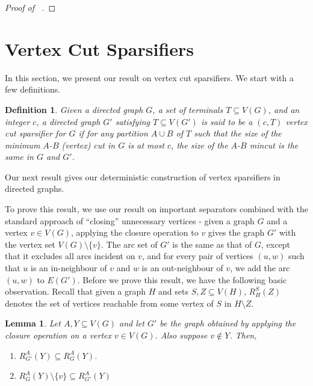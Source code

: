 \documentclass[11pt]{article}
\newtheorem{lemma}[theorem]{Lemma}
\newtheorem{definition}[theorem]{Definition}
\begin{document}
{\begin{proof}[Proof of ~]
\end{proof}


\section{Vertex Cut Sparsifiers}

In this section, we present our result on vertex cut sparsifiers. We start with a few definitions.


\begin{definition}
Given a directed graph $G$, a set of terminals $T \subseteq V(G)$, and an integer $c$, a directed graph $G'$ satisfying $T \subseteq V(G')$ is said to be a $(c,T)$ vertex cut sparsifier for $G$ if for any partition $A \cup B$ of $T$ such that the size of the minimum $A$-$B$ (vertex) cut in $G$ is at most $c$, the size of the $A$-$B$ mincut is the same in $G$ and $G'$.
\end{definition}


Our next result gives our deterministic construction of vertex sparsifiers in directed graphs.
\mimicking*


To prove this result, we use our result on important separators combined with the standard approach of ``closing'' unnecessary vertices - given a graph $G$ and a vertex $v \in V(G)$, applying the closure operation to $v$ gives the graph $G'$ with the vertex set $V(G) \setminus \{v\}$. The arc set of $G'$ is the same as that of $G$, except that it excludes all arcs incident on $v$, and for every pair of vertices $(u,w)$ such that $u$ is an in-neighbour of $v$ and $w$ is an out-neighbour of $v$,
we add the arc $(u,w)$ to $E(G')$. Before we prove this result, we have the following basic observation. Recall that given a graph $H$ and sets $S,Z \subseteq V(H)$, $R_H^S(Z)$ denotes the set of vertices reachable from some vertex of $S$ in $H \setminus Z$.

\begin{lemma}\label{lemma:closurereach}
Let $A,Y \subseteq V(G)$ and let $G'$ be the graph obtained by applying the closure operation on a vertex $v \in V(G)$. Also suppose $v \notin Y$. Then,

\begin{enumerate}
\item $R_{G'}^A(Y) \subseteq R^A_{G}(Y)$.
\item $R_G^A(Y) \setminus \{v\} \subseteq R^A_{G'}(Y)$ 


\end{enumerate}

\end{lemma}

}
\end{document}
